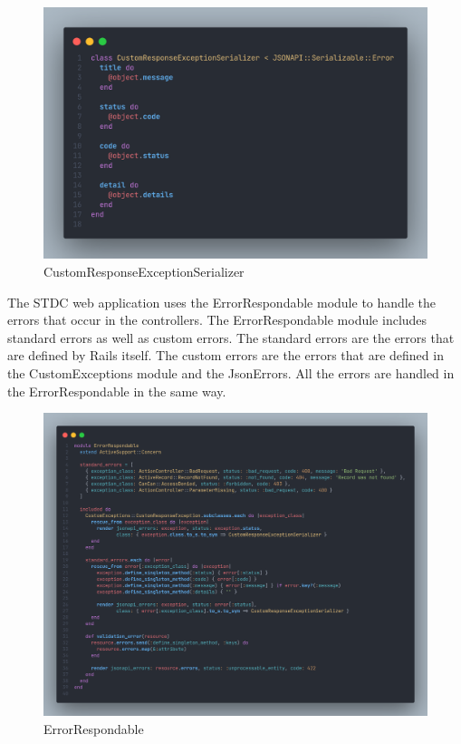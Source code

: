 \begin{justify}
    \begin{figure}[H]
        \centerline{\includegraphics[width=150mm,scale=1]{figures/implementation_and_testing/implementation/backend/custom_response_exception_serializer.png}}
        \caption{CustomResponseExceptionSerializer}
    \end{figure}

    \vspace{0.25cm}
    \newendline The STDC web application uses the ErrorRespondable module to handle the errors that occur in the controllers. The ErrorRespondable module includes standard errors as well as custom errors. 
    The standard errors are the errors that are defined by Rails itself. The custom errors are the errors that are defined in the CustomExceptions module and the JsonErrors. All the errors are handled in the ErrorRespondable in the same way.

    \begin{figure}[H]
        \centerline{\includegraphics[width=150mm,scale=1]{figures/implementation_and_testing/implementation/backend/error_respondable.png}}
        \caption{ErrorRespondable}
    \end{figure}


\end{justify}
